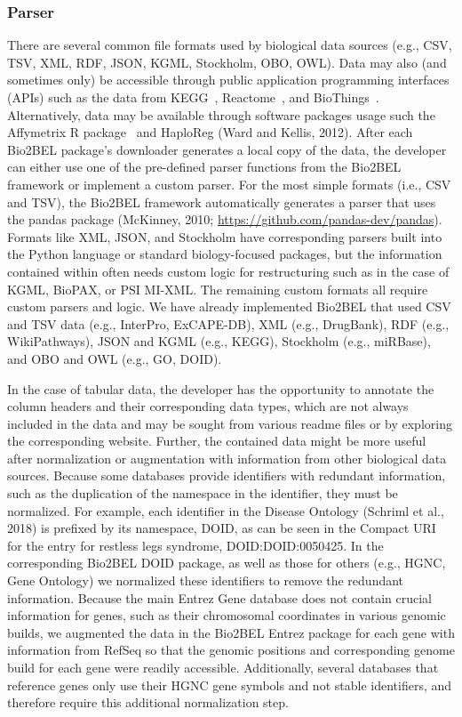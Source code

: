 \subsubsection*{Parser}
There are several common file formats used by biological data sources (e.g., CSV, TSV, XML, RDF, JSON, KGML, Stockholm, OBO, OWL).
Data may also (and sometimes only) be accessible through public application programming interfaces (APIs) such as the data from KEGG~\cite{Kanehisa2017}, Reactome~\cite{Fabregat2018}, and BioThings~\cite{Xin2016}.
Alternatively, data may be available through software packages usage such the Affymetrix R package~\cite{Gautier2004} and HaploReg (Ward and Kellis, 2012).
After each Bio2BEL package's downloader generates a local copy of the data, the developer can either use one of the pre-defined parser functions from the Bio2BEL framework or implement a custom parser.
For the most simple formats (i.e., CSV and TSV), the Bio2BEL framework automatically generates a parser that uses the pandas package (McKinney, 2010; \url{https://github.com/pandas-dev/pandas}).
Formats like XML, JSON, and Stockholm have corresponding parsers built into the Python language or standard biology-focused packages, but the information contained within often needs custom logic for restructuring such as in the case of KGML, BioPAX, or PSI MI-XML.
The remaining custom formats all require custom parsers and logic.
We have already implemented Bio2BEL that used CSV and TSV data (e.g., InterPro, ExCAPE-DB), XML (e.g., DrugBank), RDF (e.g., WikiPathways), JSON and KGML (e.g., KEGG), Stockholm (e.g., miRBase), and OBO and OWL (e.g., GO, DOID).

In the case of tabular data, the developer has the opportunity to annotate the column headers and their corresponding data types, which are not always included in the data and may be sought from various readme files or by exploring the corresponding website.
Further, the contained data might be more useful after normalization or augmentation with information from other biological data sources.
Because some databases provide identifiers with redundant information, such as the duplication of the namespace in the identifier, they must be normalized.
For example, each identifier in the Disease Ontology (Schriml et al., 2018) is prefixed by its namespace, DOID, as can be seen in the Compact URI for the entry for restless legs syndrome, DOID:DOID:0050425.
In the corresponding Bio2BEL DOID package, as well as those for others (e.g., HGNC, Gene Ontology) we normalized these identifiers to remove the redundant information.
Because the main Entrez Gene database does not contain crucial information for genes, such as their chromosomal coordinates in various genomic builds, we augmented the data in the Bio2BEL Entrez package for each gene with information from RefSeq so that the genomic positions and corresponding genome build for each gene were readily accessible.
Additionally, several databases that reference genes only use their HGNC gene symbols and not stable identifiers, and therefore require this additional normalization step.

